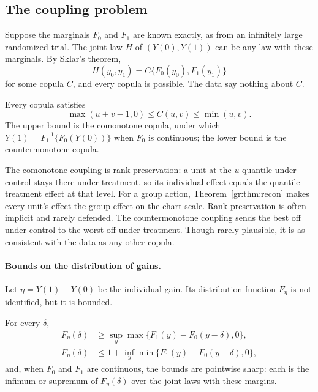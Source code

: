 \subsection{The coupling problem}

Suppose the marginals $F_0$ and $F_1$ are known exactly, as from an infinitely large randomized trial. The joint law $H$ of $(Y(0), Y(1))$ can be any law with these marginals. By Sklar's theorem,
\[
H(y_0, y_1) = C\{F_0(y_0), F_1(y_1)\}
\]
for some copula $C$, and every copula is possible. The data say nothing about $C$.

\begin{theorem}
Every copula satisfies
\[
\max(u + v - 1, 0) \leq C(u, v) \leq \min(u, v).
\]
The upper bound is the comonotone copula, under which $Y(1) = F_1^{-1}\{F_0(Y(0))\}$ when $F_0$ is continuous; the lower bound is the countermonotone copula.
\end{theorem}

The comonotone coupling is rank preservation: a unit at the $u$ quantile under control stays there under treatment, so its individual effect equals the quantile treatment effect at that level. For a group action, Theorem~\ref{gr:thm:recon} makes every unit's effect the group effect on the chart scale. Rank preservation is often implicit and rarely defended. The countermonotone coupling sends the best off under control to the worst off under treatment. Though rarely plausible, it is as consistent with the data as any other copula.

\paragraph{Bounds on the distribution of gains.} Let $\eta = Y(1) - Y(0)$ be the individual gain. Its distribution function $F_\eta$ is not identified, but it is bounded.

\begin{theorem}[Makarov]
For every $\delta$,
\begin{align*}
F_\eta(\delta) &\geq \sup_y \max\{F_1(y) - F_0(y - \delta), 0\},\\
F_\eta(\delta) &\leq 1 + \inf_y \min\{F_1(y) - F_0(y - \delta), 0\},
\end{align*}
and, when $F_0$ and $F_1$ are continuous, the bounds are pointwise sharp: each is the infimum or supremum of $F_\eta(\delta)$ over the joint laws with these margins.
\end{theorem}

